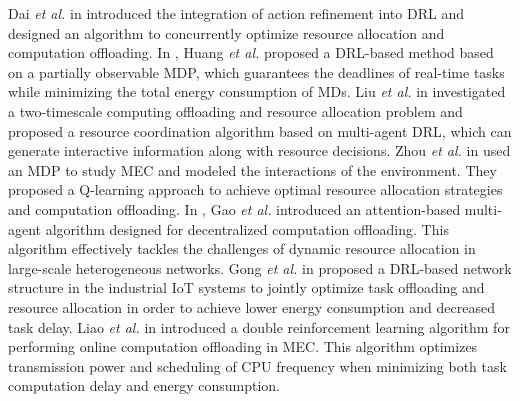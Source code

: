 \documentclass[12pt,draftclsnofoot,onecolumn]{IEEEtran}
\begin{document}
Dai \textit{et al.} in \cite{dai2020edge} introduced the integration of action refinement into DRL and designed an algorithm to concurrently optimize resource allocation and computation offloading. In \cite{huang2021deadline}, Huang \textit{et al.} proposed a DRL-based method based on a partially observable MDP, which guarantees the deadlines of real-time tasks while minimizing the total energy consumption of MDs. Liu  \textit{et al.} in \cite{liu2021learn} investigated a two-timescale computing offloading and resource allocation problem and proposed a resource coordination algorithm based on multi-agent DRL, which can generate interactive information along with resource decisions. Zhou \textit{et al.} in \cite{zhou2021deep} used an MDP to study MEC and modeled the interactions of the environment. They proposed a Q-learning approach to achieve optimal resource allocation strategies and computation offloading. In \cite{gao2022large}, Gao \textit{et al.} introduced an attention-based multi-agent algorithm designed for decentralized computation offloading. This algorithm effectively tackles the challenges of dynamic resource allocation in large-scale heterogeneous networks. Gong \textit{et al.} in \cite{gong2022edge} proposed a DRL-based network structure in the industrial IoT systems to jointly optimize task offloading and resource allocation in order to achieve lower  energy consumption and decreased task delay. Liao \textit{et al.} in \cite{liao2023online} introduced a double reinforcement learning algorithm for performing online computation offloading in MEC. This algorithm optimizes transmission power and scheduling of CPU frequency when minimizing both task computation delay and energy consumption.
\end{document}
